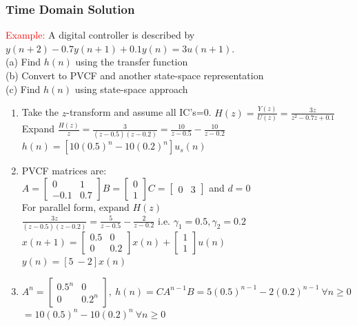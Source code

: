 \documentclass[mathserif, 10pt]{beamer} %
\begin{document}
\frame
{

\small
\renewcommand{\theenumi}{\alph{enumi}}
\frametitle{Time Domain Solution}

%
%

\textcolor{red}{Example:} A digital controller is described by $y(n+2)-0.7y(n+1) +0.1y(n) = 3u(n+1)$. \\

(a) Find $h(n)$ using the transfer function\\
(b) Convert to PVCF and another state-space representation\\
(c) Find $h(n)$ using state-space approach \\ %
\begin{enumerate}
\item Take the $z$-transform and assume all IC's=0.
$H(z) = \frac{Y(z)}{U(z)} = \frac{3z}{z^2-0.7z+0.1}$  \\
Expand $\frac{H(z)}{z} = \frac{3}{(z-0.5)(z-0.2)} = \frac{10}{z-0.5}-\frac{10}{z-0.2}$
$h(n) = [10(0.5)^n-10(0.2)^n]u_s(n)$\\

\item PVCF matrices are:\\
$A = \left[
\begin{array}{cc}
	0&1\\
	-0.1&0.7
\end{array} \right] B = \left[
\begin{array}{c}
	0\\
	1
\end{array} \right] C = \left[
\begin{array}{cc}
	0&3
\end{array} \right] $ and $d=0$\\

For parallel form, expand $H(z)$ \\
 $\frac{3z}{(z-0.5)(z-0.2)} = \frac{5}{z-0.5}-\frac{2}{z-0.2}$ i.e. $\gamma_1 = 0.5, \gamma_2 = 0.2$\\
$x(n+1) = \left[
\begin{array}{cc}
	0.5&0\\
	0&0.2
\end{array} \right] x(n) + \left[
\begin{array}{c}
	1\\
	1
\end{array} \right] u(n)$\\
$y(n) = [5~-2] x(n)$
	\item $A^n = \left[
\begin{array}{cc}
	0.5^n&0\\
	0& 0.2^n
\end{array} \right],~h(n) = CA^{n-1}B = 5(0.5)^{n-1}-2(0.2)^{n-1}~\forall n \ge 0 $\\
$= 10(0.5)^n-10(0.2)^n~ \forall n \ge 0$
\end{enumerate}


}
\end{document}
